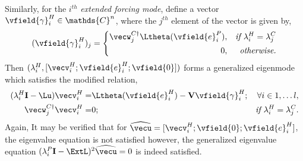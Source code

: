 Similarly, for the $i^{th}$ \emph{extended forcing mode}, define a vector $\vfield{\gamma}^{H}_{i} \in \mathds{C}^{n}$, where the $j^{th}$ element of the vector is given by,
\begin{equation}
	(\vfield{\gamma}^{H}_{i})_{j} =
	\left\lbrace
	\begin{split}
		\vecw^{C\dagger}_{j}\Ltheta(\vfield{e}^{P}_{i}),  && \textit{if } \lambda^{H}_{i} = \lambda^{C}_{j} \\
		0,						 && \textit{otherwise.}	
	\end{split}\right.
\end{equation}
Then $(\lambda^{H}_{i}, [\vecv^{H}_{i};\vfield{e}^{H}_{i}; \vfield{0}])$ forms a generalized eigenmode which satisfies the modified relation,
\begin{subequations}
	\label{eqn:singular_hmode}
	\begin{align}
		(\lambda^{H}_{i}\mathbf{I} - \Lu)\vecv^{H}_{i} =& \Ltheta(\vfield{e}^{H}_{i}) - \mathbf{V}\vfield{\gamma}^{H}_{i};&  \forall i\in 1,\ldots l, \\
		\vecw^{C\dagger}_{j}\vecv^{H}_{i} =& 0; & \textit{if } \lambda^{H}_{i} = \lambda^{C}_{j}. 
	\end{align}
\end{subequations}
Again, It may be verified that for $\widehat{\vecu} = [\vecv^{H}_{i};\vfield{0}; \vfield{e}^{H}_{i}]$, the eigenvalue equation is not satisfied however, the generalized eigenvalue equation $(\lambda^{P}_{i}\mathbf{I} - \ExtL )^{2}\widehat{\vecu} = 0$ is indeed satisfied.










